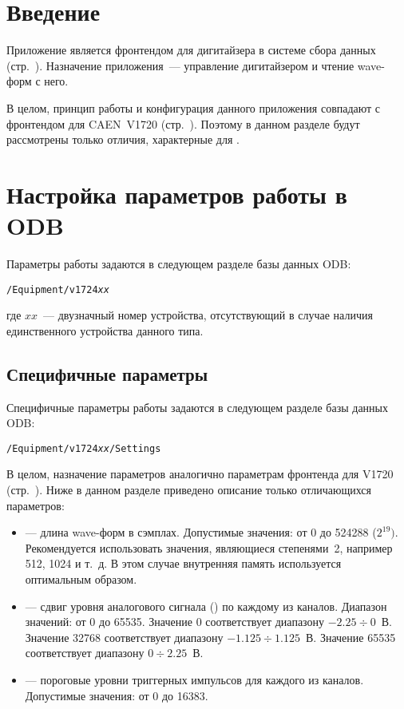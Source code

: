 \section{Введение}

Приложение \FE{} является фронтендом для дигитайзера \DEVICE{} в системе сбора данных \MIDAS{} (стр.~\pageref{sec-midas-frontend}). Назначение приложения~--- управление дигитайзером и чтение wave-форм с него.

В целом, принцип работы и конфигурация данного приложения совпадают с фронтендом для CAEN~V1720 (стр.~\pageref{sec-fe-v1720}). Поэтому в данном разделе будут рассмотрены только отличия, характерные для \DEVICE{}.

\section{Настройка параметров работы в ODB}

Параметры работы \DEVICE{} задаются в следующем разделе базы данных ODB:

\medskip

{\tt /Equipment/v1724{\it xx}}

\medskip

\noindent где $xx$~--- двузначный номер устройства, отсутствующий в случае наличия единственного устройства данного типа.

\subsection{Специфичные параметры}

Специфичные параметры работы \DEVICE{} задаются в следующем разделе базы данных ODB:

\medskip

{\tt /Equipment/v1724{\it xx}/Settings}

\medskip

В целом, назначение параметров аналогично параметрам фронтенда для V1720 (стр.~\pageref{sec-v1720-specific-params}). Ниже в данном разделе приведено описание только отличающихся параметров:

\begin{itemize}

\item {} --- длина wave-форм в сэмплах. Допустимые значения: от 0 до 524288 ($2^{19})$. Рекомендуется использовать значения, являющиеся степенями~2, например 512, 1024 и т.~д. В этом случае внутренняя память \DEVICE{} используется оптимальным образом.

\item {} --- сдвиг уровня аналогового сигнала () \cite{CaenUM3248AIS} по каждому из каналов. Диапазон значений: от 0 до 65535. Значение 0 соответствует диапазону $-2.25 \div 0$~В. Значение 32768 соответствует диапазону $-1.125 \div 1.125$~В. Значение 65535 соответствует диапазону $0 \div 2.25$~В. 

\item {} --- пороговые уровни триггерных импульсов для каждого из каналов. Допустимые значения: от 0 до 16383.

\end{itemize}

